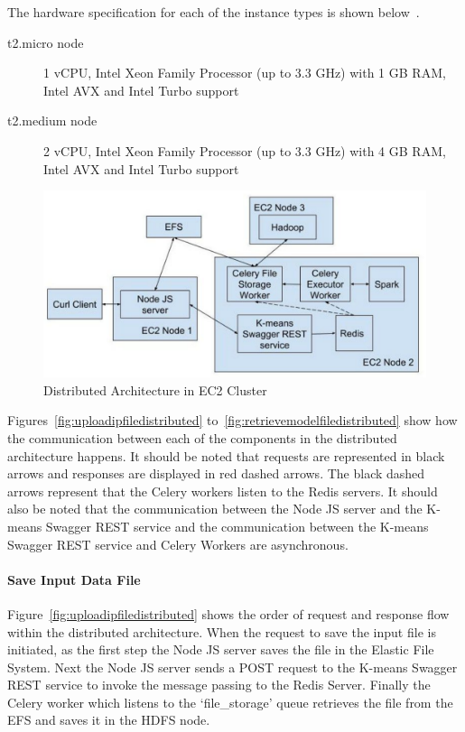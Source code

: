 The hardware specification for each of the instance types is shown 
below~\cite{hid-sp18-416-www-amazon-instance-types}.

\begin{description}
	\item[t2.micro node] 1 vCPU, Intel Xeon Family Processor (up to 3.3 GHz) 
	with 1 GB RAM, Intel AVX and Intel Turbo support
	\item[t2.medium node] 2 vCPU, Intel Xeon Family Processor (up to 3.3 GHz) 
	with 4 GB RAM, Intel AVX and Intel Turbo support
\end{description}

\begin{figure}[htbp] 
	\centering
	\includegraphics[width=\columnwidth]{images/distributedec2architecture.pdf}
	\caption{Distributed Architecture in EC2 Cluster}
\label{fig:distributedec2architecture} 
\end{figure}

Figures~\ref{fig:uploadipfiledistributed} 
to~\ref{fig:retrievemodelfiledistributed} show how the communication between 
each of the components in the distributed architecture happens. It should be 
noted that requests are represented in black arrows and responses are 
displayed in red dashed arrows. The black dashed arrows represent that the 
Celery workers listen to the Redis servers. It should also be noted that the 
communication between the Node JS server and the K-means Swagger REST 
service and the communication between the K-means Swagger REST service and 
Celery Workers are asynchronous.

\paragraph{Save Input Data File}

Figure~\ref{fig:uploadipfiledistributed} shows the order of request and 
response flow within the distributed architecture. When the request to save 
the input file is initiated, as the first step the Node JS server saves the 
file in the Elastic File System. Next the Node JS server sends a POST request 
to the K-means Swagger REST service to invoke the message passing to the Redis 
Server. Finally the Celery worker which listens to the `file\_storage' queue 
retrieves the file from the EFS and saves it in the HDFS node. 

